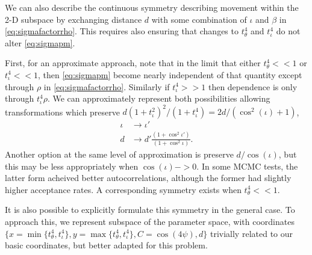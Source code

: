 \documentclass[aps,showpacs,12pt,onecolumn,prd,superscriptaddress,nofootinbib]{revtex4}
\begin{document}
We can also describe the continuous symmetry describing movement within the 2-D subspace by exchanging distance $d$ with some combination of $\iota$ and $\beta$ in  \eqref{eq:sigmafactorrho}.  This requires also ensuring that changes to $t^4_{\theta}$ and $t^4_{\iota}$ do not alter \eqref{eq:sigmapm}.

First, for an approximate approach, note that in the limit that either $t^4_\theta<<1$ or $t^4_\iota<<1$, then \eqref{eq:sigmapm} become nearly independent of that quantity except through  $\rho$ in \eqref{eq:sigmafactorrho}. Similarly if $t^4_\iota>>1$ then dependence is only through $t^4_\iota\rho$. We can approximately represent both possibilities allowing transformations which preserve $d(1+t^2_\iota)^2/(1+t^4_\iota)=2d/(\cos^2(\iota)+1)$,
\begin{align}
  \iota&\rightarrow\iota'\\
  d&\rightarrow d'\frac{(1+\cos^2{\iota'})}{(1+\cos^2{\iota})}.
\end{align}
Another option at the same level of approximation is preserve $d/\cos(\iota)$, but this may be less appropriately when $\cos(\iota)->0$.  In some MCMC tests, the latter form acheived better autocorrelations, although the former had slightly higher acceptance rates. A corresponding symmetry exists when $t^4_\theta<<1$.  

It is also possible to explicitly formulate this symmetry in the general case.
To approach this, we represent subspace of the parameter space, with coordinates $\{x=\min\{t^4_\theta,t^4_\iota\},y=\max\{t^4_\theta,t^4_\iota\},C=\cos(4\psi),d\}$ trivially related to our basic coordinates, but better adapted for this problem.
\end{document}
